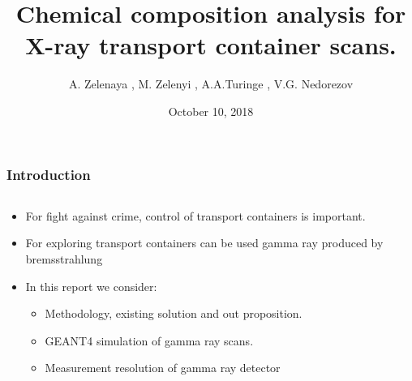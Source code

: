 \documentclass[11pt]{beamer}
\begin{document}
    \author{A. Zelenaya , M. Zelenyi , A.A.Turinge ,  V.G. Nedorezov }
    \title{Chemical composition analysis for X-ray transport container scans. }
    \date{October 10, 2018}
    \frame[plain]{\maketitle}
    
    \begin{frame}
        \frametitle{Introduction}
            \begin{columns}
            \begin{column}{0.6\textwidth}
                \begin{itemize}
                    \item For fight against crime, control of transport containers is important.
                    \item For exploring transport containers can be used gamma ray produced by bremsstrahlung
                    \item In this report we consider:
                        \begin{itemize}
                            \item Methodology, existing solution and out proposition.
                            \item GEANT4 simulation of gamma ray scans.
                            \item Measurement resolution of gamma  ray detector
                        \end{itemize}
                   

\end{itemize}
\end{column}
\end{columns}
\end{frame}
\end{document}
